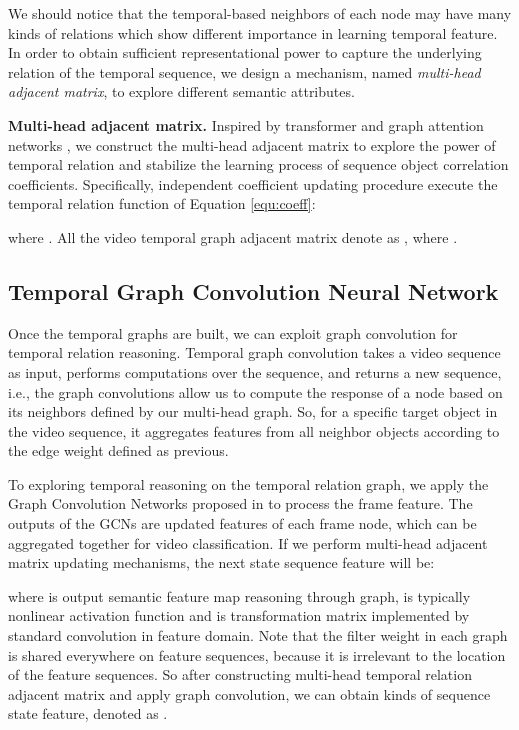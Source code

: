 \documentclass[conference,compsoc]{IEEEtran}
\begin{document}
    We should notice that the temporal-based neighbors of each node may have many kinds of relations which show different importance in learning temporal feature. In order to obtain sufficient representational power to capture the underlying relation of the temporal sequence, we design a mechanism, named \textit{multi-head adjacent matrix}, to explore different semantic attributes.
    
    \textbf{Multi-head adjacent matrix.} Inspired by transformer \cite{vaswani2017attention} and graph attention networks \cite{velickovic2018graph}, we construct the multi-head adjacent matrix to explore the power of temporal relation and stabilize the learning process of sequence object correlation coefficients. Specifically,  independent coefficient updating procedure execute the temporal relation function of Equation \ref{equ:coeff}:
    
    where . All the video temporal graph adjacent matrix denote as  , where .
    
\subsection{Temporal Graph Convolution Neural Network}
    Once the temporal graphs are built, we can exploit graph convolution for temporal relation reasoning. Temporal graph convolution takes a video sequence as input, performs computations over the sequence, and returns a new sequence, i.e., the graph convolutions allow us to compute the response of a node based on its neighbors deﬁned by our multi-head graph. So, for a specific target object  in the video sequence, it aggregates features from all neighbor objects according to the edge weight defined as previous. 

    To exploring temporal reasoning on the temporal relation graph, we apply the Graph Convolution Networks proposed in \cite{velickovic2018graph} to process the frame feature. The outputs of the GCNs are updated features of each frame node, which can be aggregated together for video classification. If we perform multi-head adjacent matrix updating mechanisms, the next state sequence feature will be:
    
    where  is output semantic feature map reasoning through graph,  is typically nonlinear activation function  and  is transformation matrix implemented by standard convolution in feature domain. Note that the filter weight  in each graph is shared everywhere on feature sequences, because it is irrelevant to the location of the feature sequences. So after constructing multi-head temporal relation adjacent matrix  and apply graph convolution, we can obtain  kinds of sequence state feature, denoted as .
\end{document}
